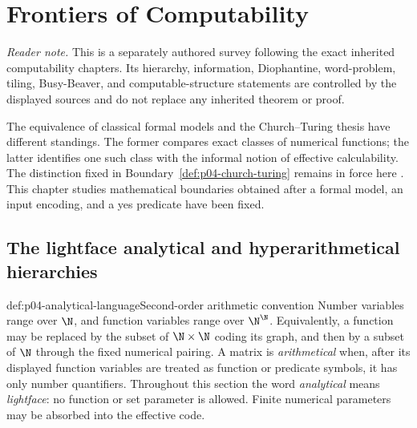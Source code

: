 
\chapter{Frontiers of Computability}
\label{sec:p04-frontiers-computability}

\noindent\textit{Reader note.} This is a separately authored survey following
the exact inherited computability chapters.  Its hierarchy, information,
Diophantine, word-problem, tiling, Busy-Beaver, and computable-structure
statements are controlled by the displayed sources and do not replace any
inherited theorem or proof.

The equivalence of classical formal models and the Church--Turing thesis have
different standings.  The former compares exact classes of numerical
functions; the latter identifies one such class with the informal notion of
effective calculability.  The distinction fixed in
Boundary~\ref{def:p04-church-turing} remains in force here
\cite{Turing1937Lambda,Soare1996ComputabilityRecursion}.  This chapter studies
mathematical boundaries obtained after a formal model, an input encoding, and
a yes predicate have been fixed.

\section{The lightface analytical and hyperarithmetical hierarchies}
\label{sec:p04-analytical-hierarchy}

\begin{hbconvention}{def:p04-analytical-language}{Second-order arithmetic convention}
Number variables range over \(\N\), and function variables range over
\(\N^{\N}\).  Equivalently, a function may be replaced by the subset of
\(\N\times\N\) coding its graph, and then by a subset of \(\N\) through the
fixed numerical pairing.  A matrix is \emph{arithmetical} when, after its displayed
function variables are treated as function or predicate symbols, it has only
number quantifiers.  Throughout this section the word \emph{analytical} means
\emph{lightface}: no function or set parameter is allowed.  Finite numerical
parameters may be absorbed into the effective code.
\end{hbconvention}

